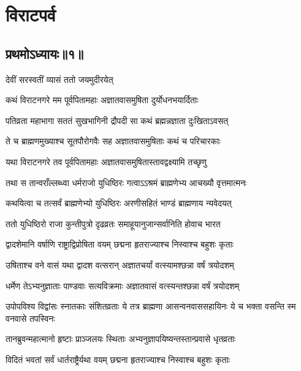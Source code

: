 \part{विराटपर्व}
\chapter{प्रथमोऽध्यायः॥१॥}

{देवीं सरस्वतीं व्यासं ततो जयमुदीरयेत्}



\twolineshloka
{कथं विराटनगरे मम पूर्वपितामहाः}
{अज्ञातवासमुषिता दुर्योधनभयार्दिताः}


\twolineshloka
{पतिव्रता महाभागा सततं सुखभागिनी}
{द्रौपदी सा कथं ब्रह्मन्नज्ञाता दुःखिताऽवसत्}


\twolineshloka
{ते च ब्राह्मणमुख्याश्च सूतपौरोगवैः सह}
{अज्ञातवासमुषिताः कथं च परिचारकाः}



\twolineshloka
{यथा विराटनगरे तव पूर्वपितामहाः}
{अज्ञातवासमुषितास्तावद्वक्ष्यामि तच्छृणु}


\twolineshloka
{तथा स तान्वराँल्लब्ध्वा धर्मराजो युधिष्ठिरः}
{गत्वाऽऽश्रमं ब्राह्मणेभ्य आचख्यौ वृत्तमात्मनः}


\twolineshloka
{कथयित्वा च तत्सर्वं ब्राह्मणेभ्यो युधिष्ठिरः}
{अरणीसहितं भाण्डं ब्राह्मणाय न्यवेदयत्}


\twolineshloka
{ततो युधिष्ठिरो राजा कुन्तीपुत्रो दृढव्रतः}
{समाहूयानुजान्सर्वानिति होवाच भारत}


\twolineshloka
{द्वादशेमानि वर्षाणि राष्ट्राद्विप्रोषिता वयम्}
{छद्मना हृतराज्याश्च निस्वाश्च बहुशः कृताः}


\twolineshloka
{उषिताश्च वने वासं यथा द्वादश वत्सरान्}
{अज्ञातचर्यां वत्स्यामश्छन्ना वर्षं त्रयोदशम्}



\twolineshloka
{धर्मेण तेऽभ्यनुज्ञाताः पाण्डवाः सत्यविक्रमाः}
{अज्ञातवासं वत्स्यन्तश्छन्ना वर्षं त्रयोदशम्}


\threelineshloka
{उपोपविश्य विद्वांसः स्नातकाः संशितव्रताः}
{ये तत्र ब्राह्मणा आसन्वनवाससहायिनः}
{ये च भक्ता वसन्ति स्म वनवासे तपस्विनः}


\twolineshloka
{तानब्रुवन्महात्मानो हृष्टाः प्राञ्जलयः स्थिताः}
{अभ्यनुज्ञापयिष्यन्तस्तान्प्रवासे धृतव्रताः}


\twolineshloka
{विदितं भवतां सर्वं धार्तराष्ट्रैर्यथा वयम्}
{छद्मना हृतराज्याश्च निस्वाश्च बहुशः कृताः}


